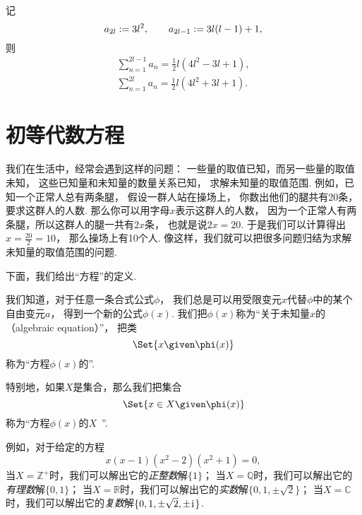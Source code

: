 \begin{proposition}[朱世杰公式]
记\begin{equation*}
	a_{2l}
	:=
	3 l^2,
	\qquad
	a_{2l-1}
	:=
	3l(l-1) + 1,
\end{equation*}
则\begin{gather*}
	\sum_{n=1}^{2l-1} a_n
	= \frac12 l (4l^2-3l+1), \\
	\sum_{n=1}^{2l} a_n
	= \frac12 l (4l^2+3l+1).
\end{gather*}
\end{proposition}

\section{初等代数方程}
我们在生活中，经常会遇到这样的问题：
一些量的取值已知，而另一些量的取值未知，
这些已知量和未知量的数量关系已知，
求解未知量的取值范围.
例如，已知一个正常人总有两条腿，
假设一群人站在操场上，
你数出他们的腿共有20条，
要求这群人的人数.
那么你可以用字母\(x\)表示这群人的人数，
因为一个正常人有两条腿，所以这群人的腿一共有\(2x\)条，
也就是说\(2x=20\).
于是我们可以计算得出\(x=\frac{20}{2}=10\)，
那么操场上有10个人.
像这样，我们就可以把很多问题归结为求解未知量的取值范围的问题.

下面，我们给出“方程”的定义.

我们知道，对于任意一条合式公式\(\phi\)，
我们总是可以用受限变元\(x\)代替\(\phi\)中的某个自由变元\(a\)，
得到一个新的公式\(\phi(x)\).
我们把\(\phi(x)\)称为“关于未知量\(x\)的（algebraic equation）”，
把类\begin{equation*}
	\Set{ x \given \phi(x) }
\end{equation*}称为“方程\(\phi(x)\)的”.

特别地，如果\(X\)是集合，那么我们把集合\begin{equation*}
	\Set{ x \in X \given \phi(x) }
\end{equation*}称为“方程\(\phi(x)\)的\(X\)~”.

例如，对于给定的方程\begin{equation*}
	x(x-1)(x^2-2)(x^2+1)=0,
\end{equation*}
当\(X=\mathbb{Z}^+\)时，我们可以解出它的\emph{正整数}解\(\{1\}\)；
当\(X=\mathbb{Q}\)时，我们可以解出它的\emph{有理数}解\(\{0,1\}\)；
当\(X=\mathbb{R}\)时，我们可以解出它的\emph{实数}解\(\{0,1,\pm\sqrt2\}\)；
当\(X=\mathbb{C}\)时，我们可以解出它的\emph{复数}解\(\{0,1,\pm\sqrt2,\pm\kern1pt\mathrm{i}\kern1pt\}\).

